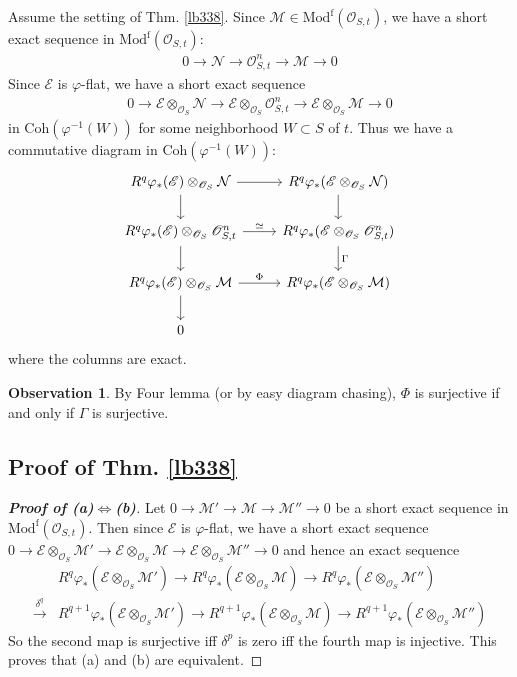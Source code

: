 \documentclass[12pt,b5paper,notitlepage]{report}
\theoremstyle{definition}
\newtheorem{obs}[df]{Observation}
\theoremstyle{plain}
\newcommand{\mc}{\mathcal}
\newcommand{\scr}{\mathscr}
\newcommand{\Coh}{\mathrm{Coh}}
\newcommand{\Modf}{\mathrm{Mod}^{\mathrm f}}
\numberwithin{equation}{section}
\begin{document}
Assume the setting of Thm. \ref{lb338}. Since $\mc M\in\Modf(\scr O_{S,t})$, we have a short exact sequence in $\Modf(\scr O_{S,t})$:
\begin{align}
0\rightarrow \mc N\rightarrow \scr O_{S,t}^n\rightarrow \mc M\rightarrow0   \label{eq172}
\end{align} 
Since $\scr E$ is $\varphi$-flat, we have a short exact sequence
\begin{align*}
0\rightarrow \scr E\otimes_{\scr O_S}\mc N\rightarrow \scr E\otimes_{\scr O_S}\scr O_{S,t}^n\rightarrow \scr E\otimes_{\scr O_S}\mc M\rightarrow0
\end{align*} 
in $\Coh(\varphi^{-1}(W))$ for some neighborhood $W\subset S$ of $t$. Thus we have a commutative diagram in $\Coh(\varphi^{-1}(W))$:
\begin{equation}\label{eq173}
\begin{tikzcd}
R^q\varphi_*(\scr E)\otimes_{\scr O_S}\mc N\arrow[r] \arrow[d]           & R^q\varphi_*(\scr E\otimes_{\scr O_S}\mc N) \arrow[d]           \\
R^q\varphi_*(\scr E)\otimes_{\scr O_S}\scr O^n_{S,t} \arrow[d] \arrow[r, "\simeq"] & R^q\varphi_*(\scr E\otimes_{\scr O_S}\scr O_{S,t}^n) \arrow[d, "\Gamma"] \\
R^q\varphi_*(\scr E)\otimes_{\scr O_S}\mc M \arrow[r, "\Phi"] \arrow[d]   & R^q\varphi_*(\scr E\otimes_{\scr O_S}\mc M)                     \\
0                               &                      
\end{tikzcd}
\end{equation}
where the columns are exact.

\begin{obs}\label{lb339}
By Four lemma (or by easy diagram chasing), $\Phi$ is surjective if and only if $\Gamma$ is surjective.
\end{obs}


\subsection{Proof of Thm. \ref{lb338}}

\begin{proof}[\textbf{Proof of (a)$\Leftrightarrow$(b)}]
Let $0\rightarrow\mc M'\rightarrow\mc M\rightarrow\mc M''\rightarrow0$ be a short exact sequence in $\Modf(\scr O_{S,t})$.  Then since $\scr E$ is $\varphi$-flat, we have a short exact sequence $0\rightarrow\scr E\otimes_{\scr O_S}\mc M'\rightarrow\scr E\otimes_{\scr O_S}\mc M\rightarrow\scr E\otimes_{\scr O_S}\mc M''\rightarrow0$ and hence an exact sequence
\begin{align*}
&R^q\varphi_*(\scr E\otimes_{\scr O_S}\mc M')\rightarrow R^q\varphi_*(\scr E\otimes_{\scr O_S}\mc M)\rightarrow R^q\varphi_*(\scr E\otimes_{\scr O_S}\mc M'')\\
\xrightarrow{\delta^q}&R^{q+1}\varphi_*(\scr E\otimes_{\scr O_S}\mc M')\rightarrow R^{q+1}\varphi_*(\scr E\otimes_{\scr O_S}\mc M)\rightarrow R^{q+1}\varphi_*(\scr E\otimes_{\scr O_S}\mc M'')
\end{align*}
So the second map is surjective iff $\delta^p$ is zero iff the fourth map is injective. This proves that (a) and (b) are equivalent. 
\end{proof}
\end{document}
